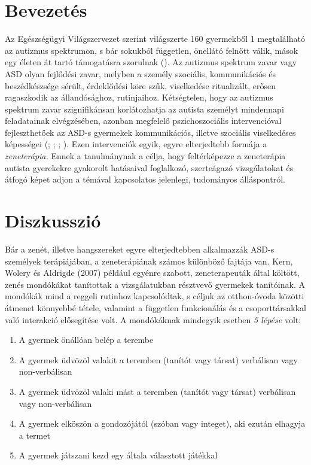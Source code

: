 \section*{Bevezetés}

Az Egészségügyi Világszervezet szerint világ\-szerte 160 gyermekből 1 megtalálható az autizmus spektrumon, s bár sokukból független, önellátó felnőtt válik, mások egy életen át tartó támogatásra szorulnak (\cite{WHO}). Az autizmus spektrum zavar vagy ASD olyan fejlődési zavar, melyben a személy szociális, kommunikációs és beszédkészsége sérült, érdeklődési köre szűk, viselkedése ritualizált, erősen ragaszkodik az állandósághoz, rutinjaihoz. Kétségtelen, hogy az autizmus spektrum zavar szignifikánsan korlátozhatja az autista személyt mindennapi feladatainak elvégzésé\-ben, azonban megfelelő pszichoszociális intervencióval fejleszthetőek az ASD-s gyermekek kommunikációs, illetve szociális viselkedéses képességei (\textcite{boso_emanuele_minazzi_abbamonte_politi_2007}; \textcite{finnigan_starr_2010}; \textcite{kern_wolery_aldridge_2006}; \textcite{kim_wigram_gold_2009}). Ezen intervenciók egyik, egyre elterjedtebb formája a \textit{zeneterápia.} Ennek a tanulmánynak a célja, hogy feltérképezze a zeneterápia autista gyerekekre gyakorolt hatásaival foglalkozó, szerteágazó vizsgá\-latokat és átfogó képet adjon a témával kapcsolatos jelenlegi, tudományos álláspontról.
\section*{Diszkusszió}

Bár a zenét, illetve hangszereket egyre elterjedtebben alkalmazzák ASD-s személyek terápiájában, a zeneterápiának számos különböző fajtája van. Kern, Wolery és Aldrigde (2007) például egyénre szabott, zeneterapeuták által költött, zenés mondóká\-kat tanítottak a vizsgálatukban résztvevő gyermekek tanítóinak. A mondókák mind a reggeli rutinhoz kapcsolódtak, s céljuk az otthon-óvoda közötti átmenet könnyebbé tétele, valamint a független funkcionálás és a csoporttársakkal való interakció elősegí\-tése volt. A mondó\-káknak mindegyik esetben \textit{5 lépése} volt:

\begin{enumerate}
	\item A gyermek önállóan belép a terembe
	
	\item A gyermek üdvözöl valakit a teremben (tanítót vagy társat) verbálisan vagy non-verbálisan
	
	\item A gyermek üdvözöl valaki mást a teremben (tanítót vagy társat) verbálisan vagy non-verbálisan
	
	\item A gyermek elköszön a gondozójától (szóban vagy integet), aki ezután elhagyja a termet
	
	\item A gyermek játszani kezd egy általa választott játékkal
\end{enumerate}

